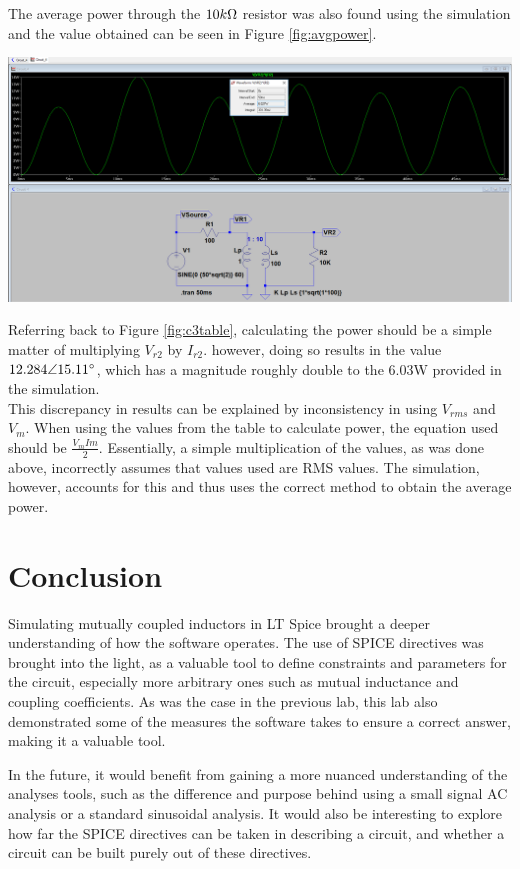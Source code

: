\documentclass[journal]{IEEEtran}
\begin{document}
\noindent The average power through the $10k\ohm$ resistor was also found using the simulation and the value obtained can be seen in Figure \ref{fig:avgpower}. 

\begingroup
    \centering
    \medskip
    \includegraphics[width=\columnwidth]{images/labx_8.png}
    \label{fig:avgpower}
    \medskip
\endgroup

\noindent Referring back to Figure \ref{fig:c3table}, calculating the power should be a simple matter of multiplying  $V_{r2}$ by  $I_{r2}$. however, doing so results in the value $12.284\angle15.11\degree$, which has a magnitude roughly double to the 6.03W provided in the simulation.\\

\noindent This discrepancy in results can be explained by inconsistency in using $V_{rms}$ and $V_{m}$. When using the values from the table to calculate power, the equation used should be $\frac{V_{m}I{m}}{2}$. Essentially, a simple multiplication of the values, as was done above, incorrectly assumes that values used are RMS values. The simulation, however, accounts for this and thus uses the correct method to obtain the average power. 

\section{Conclusion}

\noindent Simulating mutually coupled inductors in LT Spice brought a deeper understanding of how the software operates. The use of SPICE directives was brought into the light, as a valuable tool to define constraints and parameters for the circuit, especially more arbitrary ones such as mutual inductance and coupling coefficients. As was the case in the previous lab, this lab also demonstrated some of the measures the software takes to ensure a correct answer, making it a valuable tool. 

\noindent In the future, it would benefit from gaining a more nuanced understanding of the analyses tools, such as the difference and purpose behind using a small signal AC analysis or a standard sinusoidal analysis. It would also be interesting to explore how far the SPICE directives can be taken in describing a circuit, and whether a circuit can be built purely out of these directives. 





\noindent



\printbibliography
\end{document}
